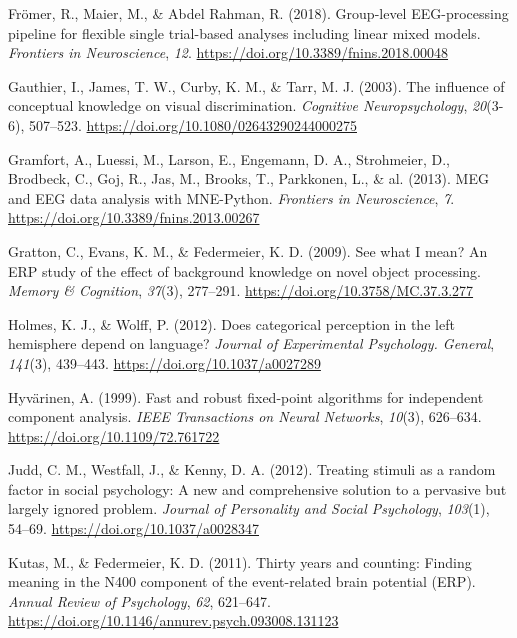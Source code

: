 \documentclass[
  english,
  man,11pt,floatsintext]{apa7}
\newlength{\cslhangindent}
\newenvironment{cslreferences}%
  {\setlength{\parindent}{0pt}%
  \everypar{\setlength{\hangindent}{\cslhangindent}}\ignorespaces}%
  {\par}
\begin{document}
\begin{cslreferences}
\leavevmode\hypertarget{ref-fruxf6mer2018}{}%
Frömer, R., Maier, M., \& Abdel Rahman, R. (2018). Group-level EEG-processing pipeline for flexible single trial-based analyses including linear mixed models. \emph{Frontiers in Neuroscience}, \emph{12}. \url{https://doi.org/10.3389/fnins.2018.00048}

\leavevmode\hypertarget{ref-gauthier2003}{}%
Gauthier, I., James, T. W., Curby, K. M., \& Tarr, M. J. (2003). The influence of conceptual knowledge on visual discrimination. \emph{Cognitive Neuropsychology}, \emph{20}(3-6), 507--523. \url{https://doi.org/10.1080/02643290244000275}

\leavevmode\hypertarget{ref-gramfort2013}{}%
Gramfort, A., Luessi, M., Larson, E., Engemann, D. A., Strohmeier, D., Brodbeck, C., Goj, R., Jas, M., Brooks, T., Parkkonen, L., \& al. (2013). MEG and EEG data analysis with MNE-Python. \emph{Frontiers in Neuroscience}, \emph{7}. \url{https://doi.org/10.3389/fnins.2013.00267}

\leavevmode\hypertarget{ref-gratton2009}{}%
Gratton, C., Evans, K. M., \& Federmeier, K. D. (2009). See what I mean? An ERP study of the effect of background knowledge on novel object processing. \emph{Memory \& Cognition}, \emph{37}(3), 277--291. \url{https://doi.org/10.3758/MC.37.3.277}

\leavevmode\hypertarget{ref-holmes2012}{}%
Holmes, K. J., \& Wolff, P. (2012). Does categorical perception in the left hemisphere depend on language? \emph{Journal of Experimental Psychology. General}, \emph{141}(3), 439--443. \url{https://doi.org/10.1037/a0027289}

\leavevmode\hypertarget{ref-hyvuxe4rinen1999}{}%
Hyvärinen, A. (1999). Fast and robust fixed-point algorithms for independent component analysis. \emph{IEEE Transactions on Neural Networks}, \emph{10}(3), 626--634. \url{https://doi.org/10.1109/72.761722}

\leavevmode\hypertarget{ref-judd2012}{}%
Judd, C. M., Westfall, J., \& Kenny, D. A. (2012). Treating stimuli as a random factor in social psychology: A new and comprehensive solution to a pervasive but largely ignored problem. \emph{Journal of Personality and Social Psychology}, \emph{103}(1), 54--69. \url{https://doi.org/10.1037/a0028347}

\leavevmode\hypertarget{ref-kutas2011}{}%
Kutas, M., \& Federmeier, K. D. (2011). Thirty years and counting: Finding meaning in the N400 component of the event-related brain potential (ERP). \emph{Annual Review of Psychology}, \emph{62}, 621--647. \url{https://doi.org/10.1146/annurev.psych.093008.131123}


\end{cslreferences}
\end{document}
